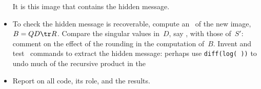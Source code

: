 \begin{reduce}
\begin{exercise}
\begin{itemize}
It is this image that contains the hidden message.

\item To check the hidden message is recoverable, compute an \svd\ of the new image, \(B=QD\tr R\).
Compare the singular values in~\(D\), say \hlist{}, with those of~\(S'\): comment on the effect of the rounding in the computation of~\(B\).
Invent and test \script\ commands to extract the hidden message: 
perhaps use \verb|diff(log( ))| to undo much of the recursive product in the 

\item Report on all code, its role, and the results.

\end{itemize}
\end{exercise}
\end{reduce}

